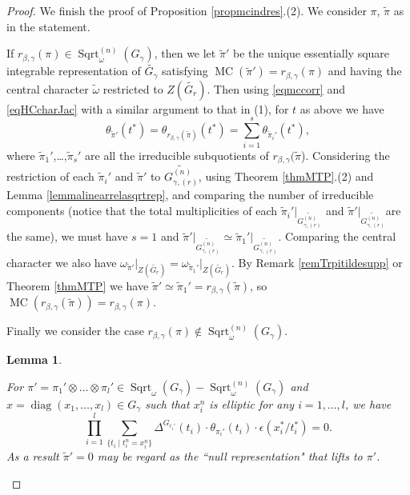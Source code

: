 \documentclass{amsart}
\numberwithin{equation}{section}
\newtheorem{lemma}[theorem]{\bf{Lemma}}
\newcommand{\rest}{\lvert}
\newcommand{\mrdiag}{\operatorname{diag}}
\newcommand{\mrsqrt}{\operatorname{Sqrt}}
\newcommand{\mrmc}{\operatorname{MC}}
\newcommand{\wt}[1]{\widetilde{#1}}
\begin{document}
\begin{proof}
		We finish the proof of Proposition \ref{propmcindres}.(2). We consider $\pi$, $\wt{\pi}$ as in the statement. 
		
		If $r_{\beta,\gamma}(\pi)\in\mrsqrt^{(n)}_{\omega}(G_{\gamma})$, then we let $\wt{\pi}'$ be the unique essentially square integrable representation of $\wt{G_{\gamma}}$ satisfying $\mrmc(\wt{\pi}')=r_{\beta,\gamma}(\pi)$ and having the central character $\wt{\omega}$ restricted to $Z(\wt{G_{r}})$. Then using \eqref{eqmccorr} and \eqref{eqHCcharJac} with a similar argument to that in (1), for $t$ as above we have
		\begin{equation}\label{eqTrpi'pii'}
			\theta_{\wt{\pi}'}(t^{*})=\theta_{r_{\beta,\gamma}(\wt{\pi})}(t^{*})=\sum_{i=1}^{s}\theta_{\wt{\pi}_{i}'}(t^{*}),
		\end{equation}
		where $\wt{\pi}_{1}'$,\dots,$\wt{\pi}_{s}'$ are all the irreducible subquotients of $r_{\beta,\gamma}(\wt{\pi}$). Considering the restriction of each $\wt{\pi}_{i}'$ and $\wt{\pi}'$ to $\wt{G_{\gamma,(r)}^{(n)}}$, using Theorem \ref{thmMTP}.(2) and Lemma \ref{lemmalinearrelasqrtrep}, and comparing the number of irreducible components (notice that the total multiplicities of each $\wt{\pi}_{i}'\rest_{\wt{G_{\gamma,(r)}^{(n)}}}$ and $\wt{\pi}'\rest_{\wt{G_{\gamma,(r)}^{(n)}}}$are the same), we must have $s=1$ and $\wt{\pi}'\rest_{\wt{G_{\gamma,(r)}^{(n)}}}\simeq \wt{\pi}_{1}'\rest_{\wt{G_{\gamma,(r)}^{(n)}}}$. Comparing the central character we also have $\omega_{\wt{\pi}'}\rest_{Z(\wt{G_{r}})}=\omega_{\wt{\pi}_{1}'}\rest_{Z(\wt{G_{r}})}$. By Remark \ref{remTrpitildesupp} or Theorem \ref{thmMTP} we have $\wt{\pi}'\simeq \wt{\pi}_{1}'=r_{\beta,\gamma}(\wt{\pi})$, so $\mrmc(r_{\beta,\gamma}(\wt{\pi}))=r_{\beta,\gamma}(\pi)$.
		
		
		Finally we consider the case $r_{\beta,\gamma}(\pi)\notin\mrsqrt_{\omega}^{(n)}(G_{\gamma})$. 
		
		\begin{lemma}\label{lemmaMCnulllift}
			
			For $\pi'=\pi_{1}'\otimes\dots\otimes\pi_{l}'\in\mrsqrt_{\omega}(G_{\gamma})-\mrsqrt^{(n)}_{\omega}(G_{\gamma})$ and $x=\mrdiag(x_{1},\dots,x_{l})\in G_{\gamma}$ such that $x_{i}^{n}$ is elliptic for any $i=1,\dots,l$, we have 
			$$\prod_{i=1}^{l}\sum_{\{t_{i}\mid t_{i}^{n}=x_{i}^{n}\}}\Delta^{G_{r_{i}'}}(t_{i})\cdot\theta_{\pi_{i}'}(t_{i})\cdot\epsilon(x_{i}^{*}/t_{i}^{*})=0.$$ 
			As a result $\wt{\pi}'=0$ may be regard as the ``null representation" that lifts to $\pi'$. 
			

\end{lemma}
\end{proof}
\end{document}

